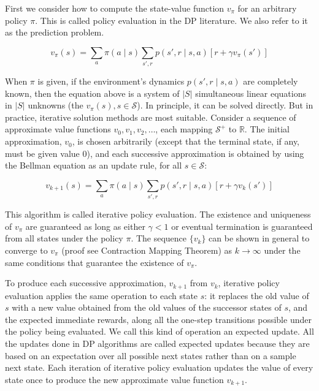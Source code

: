 \documentclass{article}
\begin{document}
First we consider how to compute the state-value function \(v_{\pi}\) for an arbitrary policy \(\pi\). 
This is called policy evaluation in the DP literature. We also refer to it as the prediction problem.

\[v_{\pi}(s) = \sum_a \pi(a \mid s) \sum_{s', r} p(s', r \mid s, a) [r + \gamma v_{\pi}(s')]\]

When \(\pi\) is given, if the environment's dynamics \(p(s', r \mid s, a)\) are completely known, 
then the equation above is a system of \(\vert S \vert\) simultaneous linear equations in \(\vert S \vert\) unknowns (the \(v_{\pi}(s), s \in \mathcal{S}\)). 
In principle, it can be solved directly. But in practice, iterative solution methods are most suitable. 
Consider a sequence of approximate value functions \(v_0 , v_1 , v_2 , \dots\), each mapping \(\mathcal{S}^{+}\) to \(\mathbb{R}\). 
The initial approximation, \(v_0\), is chosen arbitrarily (except that the terminal state, if any, must be given value 0), 
and each successive approximation is obtained by using the Bellman equation as an update rule, for all \(s \in \mathcal{S}\):

\[v_{k + 1}(s) = \sum_a \pi(a \mid s) \sum_{s', r} p(s', r \mid s, a) [r + \gamma v_{k}(s')]\]

This algorithm is called iterative policy evaluation. The existence and uniqueness of \(v_{\pi}\) are guaranteed as long as either \(\gamma < 1\) or eventual termination is guaranteed from all states under the policy \(\pi\). 
The sequence \(\{v_k\}\) can be shown in general to converge to \(v_{\pi}\) (proof see Contraction Mapping Theorem) as \(k \rightarrow \infty\) under the same conditions that guarantee the existence of \(v_{\pi}\).

To produce each successive approximation, \(v_{k + 1}\) from \(v_{k}\), iterative policy evaluation applies the same operation to each state \(s\): 
it replaces the old value of \(s\) with a new value obtained from the old values of the successor states of \(s\), and the expected immediate rewards, 
along all the one-step transitions possible under the policy being evaluated. We call this kind of operation an expected update. 
All the updates done in DP algorithms are called expected updates because they are based on an expectation over all possible next states rather than on a sample next state. 
Each iteration of iterative policy evaluation updates the value of every state once to produce the new approximate value function \(v_{k + 1}\).
\end{document}
